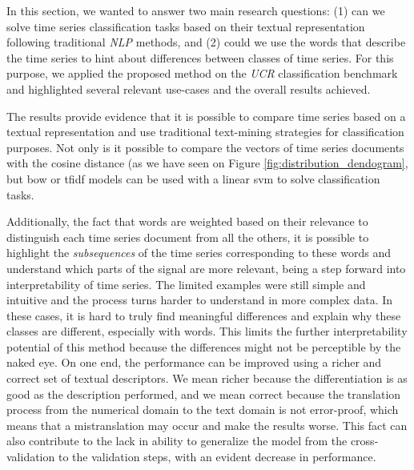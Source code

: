 In this section, we wanted to answer two main research questions: (1) can we solve time series classification tasks based on their textual representation following traditional \textit{NLP} methods, and (2) could we use the words that describe the time series to hint about differences between classes of time series. For this purpose, we applied the proposed method on the \textit{UCR} classification benchmark and highlighted several relevant use-cases and the overall results achieved.
\par
The results provide evidence that it is possible to compare time series based on a textual representation and use traditional text-mining strategies for classification purposes. Not only is it possible to compare the vectors of time series documents with the cosine distance (as we have seen on Figure \ref{fig:distribution_dendogram}, but \gls{bow} or \gls{tfidf} models can be used with a linear \gls{svm} to solve classification tasks.
\par
Additionally, the fact that words are weighted based on their relevance to distinguish each time series document from all the others, it is possible to highlight the \textit{subsequences} of the time series corresponding to these words and understand which parts of the signal are more relevant, being a step forward into interpretability of time series. The limited examples were still simple and intuitive and the process turns harder to understand in more complex data. In these cases, it is hard to truly find meaningful differences and explain why these classes are different, especially with words. This limits the further interpretability potential of this method because the differences might not be perceptible by the naked eye. On one end, the performance can be improved using a richer and correct set of textual descriptors. We mean richer because the differentiation is as good as the description performed, and we mean correct because the translation process from the numerical domain to the text domain is not error-proof, which means that a mistranslation may occur and make the results worse. This fact can also contribute to the lack in ability to generalize the model from the cross-validation to the validation steps, with an evident decrease in performance.

